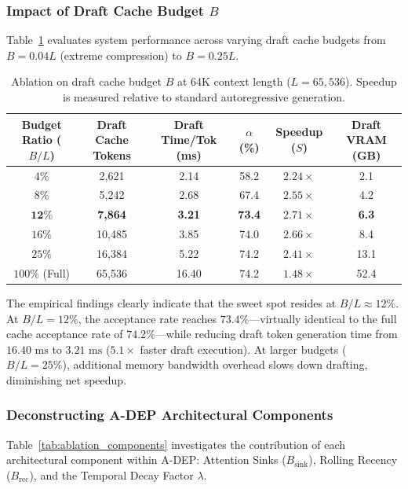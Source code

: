 \documentclass[runningheads]{llncs}
\begin{document}
\subsubsection{Impact of Draft Cache Budget $B$}
Table~\ref{tab:ablation_budget} evaluates system performance across varying draft cache budgets from $B = 0.04L$ (extreme compression) to $B = 0.25L$. 

\begin{table}[t]
\centering
\caption{Ablation on draft cache budget $B$ at 64K context length ($L = 65,536$). Speedup is measured relative to standard autoregressive generation.}
\label{tab:ablation_budget}
\small
\begin{tabular}{cccccc}
\toprule
\textbf{Budget Ratio ($B/L$)} & \textbf{Draft Cache Tokens} & \textbf{Draft Time/Tok (ms)} & \textbf{$\alpha$ (\%)} & \textbf{Speedup ($S$)} & \textbf{Draft VRAM (GB)} \\
\midrule
$4\%$  & 2,621  & 2.14 & 58.2 & $2.24\times$ & 2.1 \\
$8\%$  & 5,242  & 2.68 & 67.4 & $2.55\times$ & 4.2 \\
$\mathbf{12\%}$ & \textbf{7,864} & \textbf{3.21} & \textbf{73.4} & $\mathbf{2.71\times}$ & \textbf{6.3} \\
$16\%$ & 10,485 & 3.85 & 74.0 & $2.66\times$ & 8.4 \\
$25\%$ & 16,384 & 5.22 & 74.2 & $2.41\times$ & 13.1 \\
$100\%$ (Full) & 65,536 & 16.40 & 74.2 & $1.48\times$ & 52.4 \\
\bottomrule
\end{tabular}
\end{table}

The empirical findings clearly indicate that the sweet spot resides at $B/L \approx 12\%$. At $B/L = 12\%$, the acceptance rate reaches $73.4\%$---virtually identical to the full cache acceptance rate of $74.2\%$---while reducing draft token generation time from $16.40\text{ ms}$ to $3.21\text{ ms}$ ($5.1\times$ faster draft execution). At larger budgets ($B/L = 25\%$), additional memory bandwidth overhead slows down drafting, diminishing net speedup.

\subsubsection{Deconstructing A-DEP Architectural Components}
Table~\ref{tab:ablation_components} investigates the contribution of each architectural component within A-DEP: Attention Sinks ($B_{\text{sink}}$), Rolling Recency ($B_{\text{rec}}$), and the Temporal Decay Factor $\lambda$.
\end{document}
